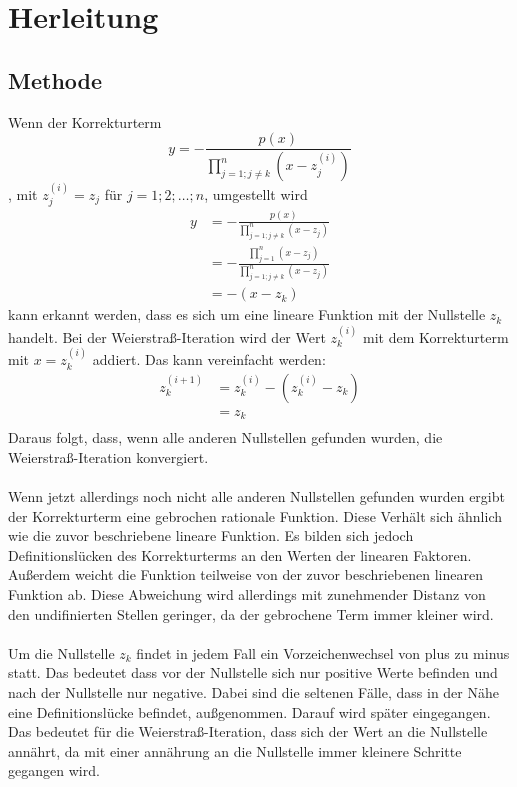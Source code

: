 \documentclass{article}
\begin{document}
\section{Herleitung}
\subsection{Methode}
Wenn der Korrekturterm 
\begin{equation*}
    y=-\frac{p(x)}{\prod_{j=1;j\neq k}^{n}(x-z_j^{(i)})}
\end{equation*}
, mit $z_j^{(i)} = z_j$ für $j=1;2;\dots;n$, umgestellt wird
\begin{align*}
    y&=-\frac{p(x)}{\prod_{j=1;j\neq k}^{n}(x-z_j)} \\
     &=-\frac{\prod_{j=1}^{n}(x-z_j)}{\prod_{j=1;j\neq k}^{n}(x-z_j)} \\
     &=-(x-z_k)
\end{align*}
kann erkannt werden, dass es sich um eine lineare Funktion mit der Nullstelle $z_k$ handelt. Bei der Weierstraß-Iteration wird der Wert $z_k^{(i)}$ mit dem Korrekturterm mit $x=z_k^{(i)}$ addiert. Das kann vereinfacht werden:
\begin{align*}
    z_k^{(i+1)}&=z_k^{(i)}-(z_k^{(i)}-z_k) \\
    &= z_k \\
\end{align*}
Daraus folgt, dass, wenn alle anderen Nullstellen gefunden wurden, die Weierstraß-Iteration konvergiert. \\
\\
Wenn jetzt allerdings noch nicht alle anderen Nullstellen gefunden wurden ergibt der Korrekturterm eine gebrochen rationale Funktion. Diese Verhält sich ähnlich wie die zuvor beschriebene lineare Funktion. Es bilden sich jedoch Definitionslücken des Korrekturterms an den Werten der linearen Faktoren. Außerdem weicht die Funktion teilweise von der zuvor beschriebenen linearen Funktion ab. Diese Abweichung wird allerdings mit zunehmender Distanz von den undifinierten Stellen geringer, da der gebrochene Term immer kleiner wird. \\
\\
Um die Nullstelle $z_k$ findet in jedem Fall ein Vorzeichenwechsel von plus zu minus statt. Das bedeutet dass vor der Nullstelle sich nur positive Werte befinden und nach der Nullstelle nur negative.
Dabei sind die seltenen Fälle, dass in der Nähe eine Definitionslücke befindet, außgenommen. Darauf wird später eingegangen.
Das bedeutet für die Weierstraß-Iteration, dass sich der Wert an die Nullstelle annährt, da mit einer annährung an die Nullstelle immer kleinere Schritte gegangen wird.\\
\end{document}
